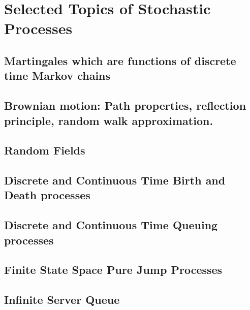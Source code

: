 \chapter{Selected Topics of Stochastic Processes}
\section{Martingales which are functions of discrete time Markov chains}
\section{Brownian motion: Path properties, reflection principle, random walk approximation.}
\section{Random Fields}
\section{Discrete and Continuous Time Birth and Death processes}
\section{Discrete and Continuous Time Queuing processes}
\section{Finite State Space Pure Jump Processes}
\section{Infinite Server Queue}
